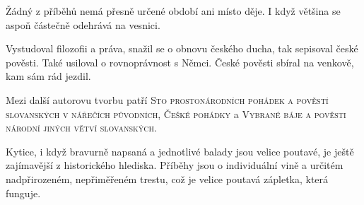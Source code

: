 \documentclass[FGBook.tex]{subfiles}
\begin{document}
\noindent 
Žádný z příběhů nemá přesně určené období ani místo děje. I když většina se aspoň částečně odehrává na vesnici.







\noindent 
Vystudoval filozofii a práva, snažil se o obnovu českého ducha, tak sepisoval české pověsti. Také usiloval o rovnoprávnost s Němci. České pověsti sbíral na venkově, kam sám rád jezdil.


\noindent Mezi další autorovu tvorbu patří \textsc{Sto prostonárodních pohádek a pověstí slovanských v nářečích původních}, \textsc{Češké pohádky} a \textsc{Vybrané báje a pověsti národní jiných větví slovanských}.






\noindent 
Kytice, i když bravurně napsaná a jednotlivé balady jsou velice poutavé, je ještě zajímavější z historického hlediska. Příběhy jsou o individuální vině a určitém nadpřirozeném, nepřiměřeném trestu, což je velice poutavá zápletka, která funguje.

\vfill
\end{document}
